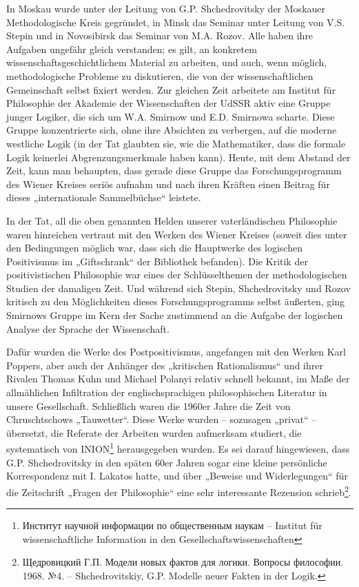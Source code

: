 \documentclass[11pt,a4paper]{article}
\begin{document}
In Moskau wurde unter der Leitung von G.P. Shchedrovitsky der Moskauer
Methodologische Kreis gegründet, in Minsk das Seminar unter Leitung von
V.S. Stepin und in Novosibirsk das Seminar von M.A. Rozov. Alle haben ihre
Aufgaben ungefähr gleich verstanden; es gilt, an konkretem
wissenschaftsgeschichtlichem Material zu arbeiten, und auch, wenn möglich,
methodologische Probleme zu diskutieren, die von der wissenschaftlichen
Gemeinschaft selbst fixiert werden. Zur gleichen Zeit arbeitete am Institut
für Philosophie der Akademie der Wissenschaften der UdSSR aktiv eine Gruppe
junger Logiker, die sich um W.A. Smirnow und E.D. Smirnowa scharte. Diese
Gruppe konzentrierte sich, ohne ihre Absichten zu verbergen, auf die moderne
westliche Logik (in der Tat glaubten sie, wie die Mathematiker, dass die
formale Logik keinerlei Abgrenzungsmerkmale haben kann). Heute, mit dem
Abstand der Zeit, kann man behaupten, dass gerade diese Gruppe das
Forschungsprogramm des Wiener Kreises seriös aufnahm und nach ihren Kräften
einen Beitrag für dieses „internationale Sammelbüchse“ leistete.

In der Tat, all die oben genannten Helden unserer vaterländischen Philosophie
waren hinreichen vertraut mit den Werken des Wiener Kreises (soweit dies unter
den Bedingungen möglich war, dass sich die Hauptwerke des logischen
Positivismus im „Giftschrank“ der Bibliothek befanden). Die Kritik der
positivistischen Philosophie war eines der Schlüsselthemen der
methodologischen Studien der damaligen Zeit. Und während sich Stepin,
Shchedrovitsky und Rozov kritisch zu den Möglichkeiten dieses
Forschungsprogramms selbst äußerten, ging Smirnows Gruppe im Kern der Sache
zustimmend an die Aufgabe der logischen Analyse der Sprache der Wissenschaft.

Dafür wurden die Werke des Postpositivismus, angefangen mit den Werken Karl
Poppers, aber auch der Anhänger des „kritischen Rationalismus“ und ihrer
Rivalen Thomas Kuhn und Michael Polanyi relativ schnell bekannt, im Maße der
allmählichen Infiltration der englischsprachigen philosophischen Literatur in
unsere Gesellschaft.  Schließlich waren die 1960er Jahre die Zeit von
Chruschtschows „Tauwetter“. Diese Werke wurden -- sozusagen „privat“ --
übersetzt, die Referate der Arbeiten wurden aufmerksam studiert, die
systematisch von INION\footnote{\foreignlanguage{russian}{Институт научной
    информации по общественным наукам} -- Institut für wissenschaftliche
  Information in den Gesellschaftswissenschaften} herausgegeben wurden. Es sei
darauf hingewiesen, dass G.P. Shchedrovitsky in den späten 60er Jahren sogar
eine kleine persönliche Korrespondenz mit I. Lakatos hatte, und über „Beweise
und Widerlegungen“ für die Zeitschrift „Fragen der Philosophie“ eine sehr
interessante Rezension schrieb\footnote{\foreignlanguage{russian}{Щедровицкий
    Г.П. Модели новых фактов для логики. Вопросы философии. 1968. №4}. --
  Shchedrovitskiy, G.P. Modelle neuer Fakten in der Logik.}.
\end{document}
